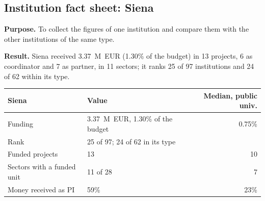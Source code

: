 \documentclass[11pt,a4paper]{article}
\begin{document}
\subsection{Institution fact sheet: Siena}
\textbf{Purpose.} To collect the figures of one institution and compare them with the other institutions of the same type.

\textbf{Result.} Siena received 3.37~M~EUR (1.30\% of the budget) in 13 projects, 6 as coordinator and 7 as partner, in 11 sectors; it ranks 25 of 97 institutions and 24 of 62 within its type.

\begin{table}[H]
\centering
\begin{tabular}{llr}
\toprule
Siena & Value & Median, public univ. \\
\midrule
Funding & 3.37~M~EUR, 1.30\% of the budget & 0.75\% \\
Rank & 25 of 97; 24 of 62 in its type &  \\
Funded projects & 13 & 10 \\
Sectors with a funded unit & 11 of 28 & 7 \\
Money received as PI & 59\% & 23\% \\
\bottomrule
\end{tabular}
\end{table}
\end{document}
